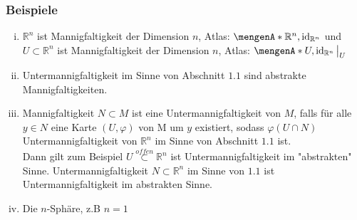\subsubsection[Beispiele für differenzierbare Mannigfaltigkeiten]{Beispiele}	
\label{ssub:123}
\begin{enumerate}[(i)]
	\item $\mathds{R}^n$ ist Mannigfaltigkeit der Dimension $n$, Atlas: $\set{\mathds{R}^n,\id_{\mathds{R}^n}}$ und $U\subset \mathds{R}^n$ ist Mannigfaltigkeit der Dimension $n$, Atlas: $\set{U,\id_{\mathds{R}^n}\big\vert_U}$
	\item Untermannigfaltigkeit im Sinne von Abschnitt $1.1$ sind abstrakte Mannigfaltigkeiten.
	\item Mannigfaltigkeit $N\subset M$ ist eine Untermannigfaltigkeit von $M$, falls für alle $y\in N$ eine Karte $(U,\varphi)$ von M um $y$ existiert, sodass $\varphi(U\cap N)$ Untermannigfaltigkeit von $\mathds{R}^n$ im Sinne von Abschnitt $1.1$ ist.\\
Dann gilt zum Beispiel $U \overset{offen}{\subset} \mathds{R}^n$ ist Untermannigfaltigkeit im "abstrakten" Sinne. Untermannigfaltigkeit $N\subset \mathds{R}^n$ im Sinne von $1.1$ ist Untermannigfaltigkeit im abstrakten Sinne.
	\item Die $n$-Sphäre, z.B $n = 1$
	\begin{figure}[H]
\end{figure}
\end{enumerate}
